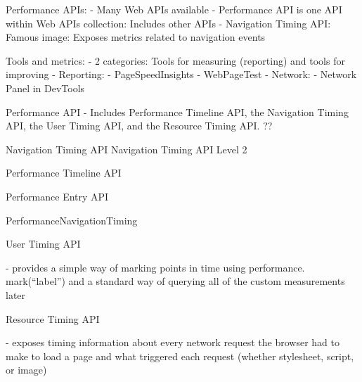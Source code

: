 Performance APIs:
- Many Web APIs available %
- Performance API is one API within Web APIs collection: Includes other APIs
- Navigation Timing API: Famous image: Exposes metrics related to navigation events

Tools and metrics:
- 2 categories: Tools for measuring (reporting) and tools for improving
- Reporting:
- PageSpeedInsights
- WebPageTest
- Network:
- Network Panel in DevTools





Performance API %
- Includes Performance Timeline API, the Navigation Timing API, the User Timing API, and the Resource Timing API.  ??



Navigation Timing API %
Navigation Timing API Level 2 %






Performance Timeline API %





Performance Entry API %





PerformanceNavigationTiming %



User Timing API %

- provides a simple way of marking points in time using performance. mark(“label”) and a standard way of querying all of the custom measurements later




Resource Timing API %

- exposes timing information about every network request the browser had to make to load a page and what triggered each request (whether stylesheet, script, or image)




